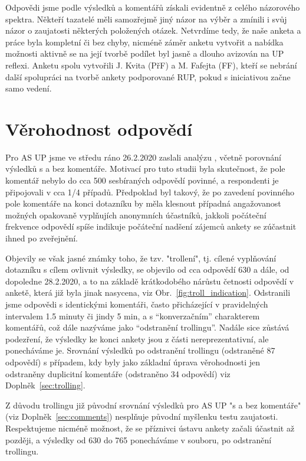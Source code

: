 \documentclass[a4paper,twoside]{article}
\begin{document}
Odpovědi jsme podle výsledků a komentářů získali evidentně z celého názorového spektra. Někteří tazatelé měli samozřejmě jiný názor na výběr a zmínili i svůj názor o zaujatosti některých položených otázek. Netvrdíme tedy, že naše anketa a práce byla kompletní či bez chyby, nicméně záměr anketu vytvořit a nabídka možnosti aktivně se na její tvorbě podílet byl jasně a dlouho avizován na UP reflexi. Anketu spolu vytvořili J. Kvita (PřF) a M. Fafejta (FF), kteří se nebrání další spolupráci na tvorbě ankety podporované RUP, pokud s iniciativou začne samo vedení.


\section{Věrohodnost odpovědí}
\label{sec:Sel}
Pro AS UP jsme ve středu ráno 26.2.2020 zaslali analýzu , včetně porovnání výsledků s a bez komentáře.
Motivací pro tuto studii byla skutečnost, že pole komentář nebylo do cca 500 sesbíraných odpovědí povinné, a respondenti je připojovali v cca 1/4 případů. Předpoklad byl takový, že po zavedení povinného pole komentáře na konci dotazníku by měla klesnout případná angažovanost možných opakovaně vyplňujích anonymních účastníků, jakkoli počáteční frekvence odpovědí spíše indikuje počáteční nadšení zájemců ankety se zúčastnit ihned po zveřejnění. 

Objevily se však jasné známky toho, že tzv. "trollení", tj. cílené vyplňování dotazníku s cílem ovlivnit výsledky, se objevilo od cca odpovědí 630 a dále, od dopoledne 28.2.2020, a to na základě krátkodobého nárůstu četnosti odpovědí v anketě, která již byla jinak nasycena, viz Obr.~\ref{fig:troll_indication}. Odstranili jsme odpovědi s identickými komentáři, často přicházející v pravidelných intervalem 1.5 minuty či jindy 5 min, a s ``konverzačním'' charakterem komentářů, což dále nazýváme jako ``odstranění trollingu''. Nadále sice zůstává podezření, že výsledky ke konci ankety jsou z části nereprezentativní, ale ponecháváme je. Srovnání výsledků po odstranění trollingu (odstraněné 87 odpovědí) s případem, kdy byly jako základní úprava věrohodnosti jen odstraněny duplicitní komentáře (odstraněno 34 odpovědí) viz Doplněk~\ref{sec:trolling}.

Z důvodu trollingu již původní srovnání výsledků pro AS UP "s a bez komentáře" (viz Doplněk~\ref{sec:comments}) nesplňuje původní myšlenku testu zaujatosti. Respektujeme nicméně možnost, že se příznivci ústavu ankety začali účastnit až později, a výsledky od 630 do 765 ponecháváme v souboru, po odstranění trollingu. 
\end{document}
